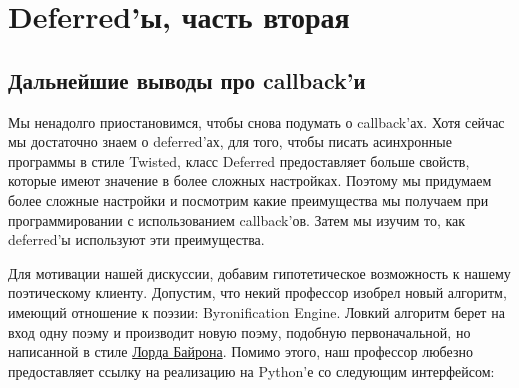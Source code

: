 
\section{Deferred'ы, часть вторая\label{sec:part9}}

\subsection{Дальнейшие выводы про callback'и}

Мы ненадолго приостановимся, чтобы снова подумать о callback'ах. 
Хотя сейчас мы достаточно знаем о deferred'ах, для того, чтобы 
писать асинхронные программы в стиле Twisted, класс Deferred 
предоставляет больше свойств, которые имеют значение в более 
сложных настройках. Поэтому мы придумаем более сложные настройки и 
посмотрим какие преимущества мы получаем при программировании 
с использованием callback'ов. Затем мы изучим то, как deferred'ы 
используют эти преимущества.   



Для мотивации нашей дискуссии, добавим гипотетическое возможность 
к нашему поэтическому клиенту. Допустим, что некий профессор изобрел 
новый алгоритм, имеющий отношение к поэзии: Byronification Engine. 
Ловкий алгоритм берет на вход одну поэму и производит новую поэму, 
подобную первоначальной, но написанной в стиле 
\href{http://en.wikipedia.org/wiki/George\_Gordon\_Byron,\_6th\_Baron\_Byron}{Лорда Байрона}. 
Помимо этого, наш профессор любезно предоставляет ссылку на 
реализацию на Python'е со следующим интерфейсом:


